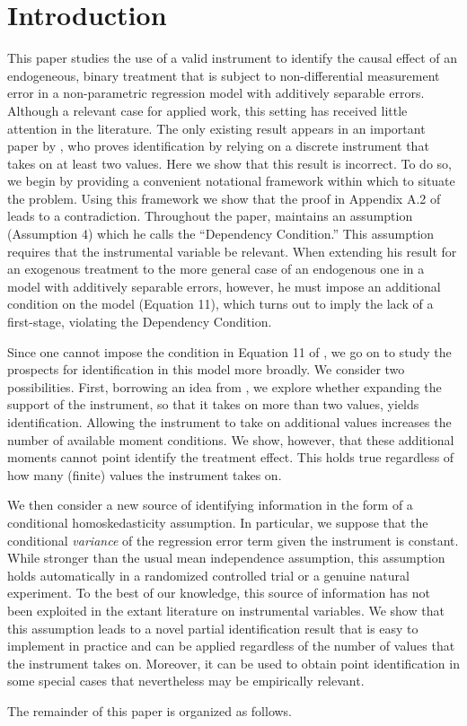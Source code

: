 \section{Introduction}

This paper studies the use of a valid instrument to identify the causal effect of an endogeneous, binary treatment that is subject to non-differential measurement error in a non-parametric regression model with additively separable errors. 
Although a relevant case for applied work, this setting has received little attention in the literature.
The only existing result appears in an important paper by \cite{Mahajan}, who proves identification by relying on a discrete instrument that takes on at least two values.   
Here we show that this result is incorrect. 
To do so, we begin by providing a convenient notational framework within which to situate the problem.
Using this framework we show that the proof in Appendix A.2 of \cite{Mahajan} leads to a contradiction.
Throughout the paper, \cite{Mahajan} maintains an assumption (Assumption 4) which he calls the ``Dependency Condition.'' 
This assumption requires that the instrumental variable be relevant.
When extending his result for an exogenous treatment to the more general case of an endogenous one in a model with additively separable errors, however, he must impose an additional condition on the model (Equation 11), which turns out to imply the lack of a first-stage, violating the Dependency Condition.

Since one cannot impose the condition in Equation 11 of \cite{Mahajan}, we go on to study the prospects for identification in this model more broadly.
We consider two possibilities.
First, borrowing an idea from \cite{Lewbel}, we explore whether expanding the support of the instrument, so that it takes on more than two values, yields identification.
Allowing the instrument to take on additional values increases the number of available moment conditions.
We show, however, that these additional moments cannot point identify the treatment effect.
This holds true regardless of how many (finite) values the instrument takes on.

We then consider a new source of identifying information in the form of a conditional homoskedasticity assumption. 
In particular, we suppose that the conditional \emph{variance} of the regression error term given the instrument is constant.
While stronger than the usual mean independence assumption, this assumption holds automatically in a randomized controlled trial or a genuine natural experiment. 
To the best of our knowledge, this source of information has not been exploited in the extant literature on instrumental variables.  
We show that this assumption leads to a novel partial identification result that is easy to implement in practice and can be applied regardless of the number of values that the instrument takes on.
Moreover, it can be used to obtain point identification in some special cases that nevertheless may be empirically relevant. 

The remainder of this paper is organized as follows.


 


